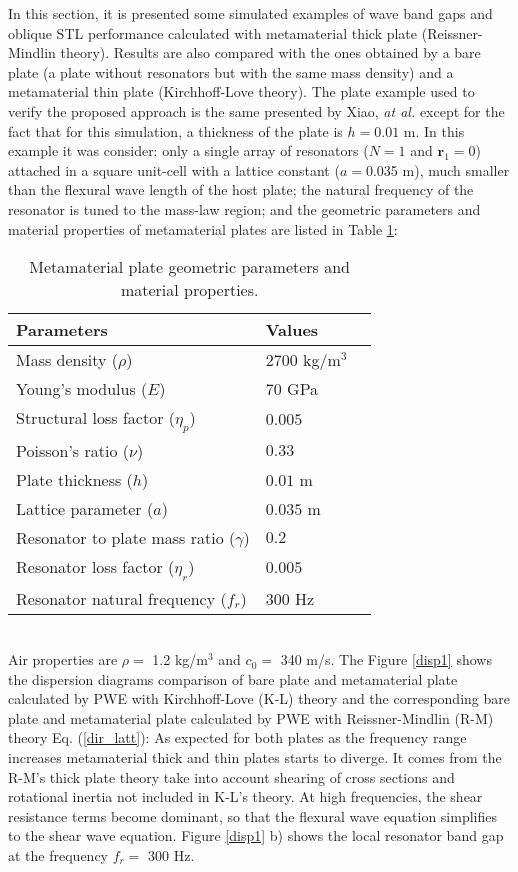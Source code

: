\documentclass[a4paper]{ICEDyn}
\begin{document}
In this section, it is presented some simulated examples of wave band gaps and oblique STL performance calculated with metamaterial thick plate (Reissner-Mindlin theory). Results are also compared with the ones obtained by a bare plate (a plate without resonators but with the same mass density) and a metamaterial thin plate (Kirchhoff-Love theory). The plate example used to verify the proposed approach is the same presented by Xiao, \textit{at al.} \cite{Xiao2012s} except for the fact that for this simulation, a thickness of the plate is $h = 0.01$ m. In this example it was consider: only a single array of resonators ($ N=1 $ and $ \mathbf{r}_1=0 $) attached in a square unit-cell with a lattice constant ($ a= $0.035 m), much smaller than the flexural wave length of the host plate; the natural frequency of the resonator is tuned to the mass-law region; and the geometric parameters and material properties of metamaterial plates are listed in Table \ref{tab1}: 
\begin{table}
	\centering
	\caption{Metamaterial plate geometric parameters and material properties.}
	\begin{tabular}{llr}
		\hline
		Parameters\hspace{50 mm}   	 				& Values  			 \\
		\hline
		Mass density ($\rho$)     					& $2700$ kg/m$^3$      \\
		Young's modulus ($E$)        				& $70$ GPa      	 \\
		Structural loss factor ($\eta_p$)     		& $0.005$            \\
		Poisson's ratio ($\nu$)       				& $0.33$          	 \\
		Plate thickness ($h$) 						& $0.01$ m          \\
		Lattice parameter ($a$) 					& $0.035$ m          \\
		Resonator to plate mass ratio ($ \gamma $) 	& $0.2$            	 \\
		Resonator loss factor ($ \eta_r $)  		& $0.005$            \\
		Resonator natural frequency ($ f_r $) 		& $300$ Hz           \\
		\hline
	\end{tabular}
	\label{tab1}
\end{table}
 \\
%
Air properties are $ \rho = $ 1.2 kg/m$^3$ and $ c_0 = $ 340 m/s. The Figure \ref{disp1} shows the dispersion diagrams comparison of bare plate and metamaterial plate calculated by PWE with Kirchhoff-Love (K-L) theory \cite{Xiao2012f} and the corresponding bare plate and metamaterial plate calculated by PWE with Reissner-Mindlin (R-M) theory Eq. (\ref{dir_latt}): As expected for both plates as the frequency range increases metamaterial thick and thin plates starts to diverge. It comes from the R-M's thick plate theory take into account shearing of cross sections and rotational inertia not included in K-L's theory. At high frequencies, the shear resistance terms become dominant, so that the flexural wave equation simplifies to the shear wave equation. Figure \ref{disp1} b) shows the local resonator band gap at the frequency $ f_r = $ 300 Hz.
\end{document}
